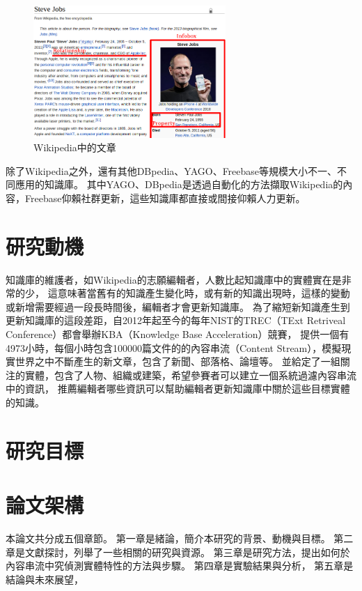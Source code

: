 \begin{figure}
\centering
\includegraphics[width=0.65\textwidth]{images/01-wiki-as-kb}
\caption{Wikipedia中的文章}
\label{i:wiki}
\end{figure}

除了Wikipedia之外，還有其他DBpedia\cite{dbpedia-swj}、YAGO\cite{suchanek2007WWW}、Freebase\cite{freebase}等規模大小不一、不同應用的知識庫。
其中YAGO、DBpedia是透過自動化的方法擷取Wikipedia的內容，Freebase仰賴社群更新，這些知識庫都直接或間接仰賴人力更新。  %

%
%
\section{研究動機}
知識庫的維護者，如Wikipedia的志願編輯者，人數比起知識庫中的實體實在是非常的少， %
這意味著當舊有的知識產生變化時，或有新的知識出現時，這樣的變動或新增需要經過一段長時間後，編輯者才會更新知識庫。
為了縮短新知識產生到更新知識庫的這段差距，自2012年起至今的每年NIST的TREC（TExt Retriveal Conference）都會舉辦KBA（Knowledge Base Acceleration）競賽，
提供一個有4973小時，每個小時包含100000篇文件的的內容串流（Content Stream），模擬現實世界之中不斷產生的新文章，包含了新聞、部落格、論壇等。
並給定了一組關注的實體，包含了人物、組織或建築，希望參賽者可以建立一個系統過濾內容串流中的資訊，
推薦編輯者哪些資訊可以幫助編輯者更新知識庫中關於這些目標實體的知識。






%
%
\section{研究目標}

%
%
\section{論文架構}  %
本論文共分成五個章節。
第一章是緒論，簡介本研究的背景、動機與目標。
第二章是文獻探討，列舉了一些相關的研究與資源。
第三章是研究方法，提出如何於內容串流中究偵測實體特性的方法與步驟。
第四章是實驗結果與分析，
第五章是結論與未來展望，

